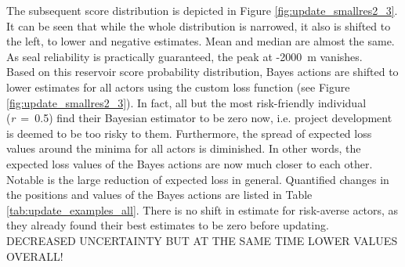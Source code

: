 				The subsequent score distribution is depicted in Figure \ref{fig:update_smallres2_3}. It can be seen that while the whole distribution is narrowed, it also is shifted to the left, to lower and negative estimates. Mean and median are almost the same. As seal reliability is practically guaranteed, the peak at -2000~m vanishes.\\				
				Based on this reservoir score probability distribution, Bayes actions are shifted to lower estimates for all actors using the custom loss function (see Figure \ref{fig:update_smallres2_3}). In fact, all but the most risk-friendly individual (\textit{r}~=~0.5) find their Bayesian estimator to be zero now, i.e. project development is deemed to be too risky to them. Furthermore, the spread of expected loss values around the minima for all actors is diminished. In other words, the expected loss values of the Bayes actions are now much closer to each other. Notable is the large reduction of expected loss in general. Quantified changes in the positions and values of the Bayes actions are listed in Table \ref{tab:update_examples_all}. There is no shift in estimate for risk-averse actors, as they already found their best estimates to be zero before updating.
				DECREASED UNCERTAINTY BUT AT THE SAME TIME LOWER VALUES OVERALL!\\
				
